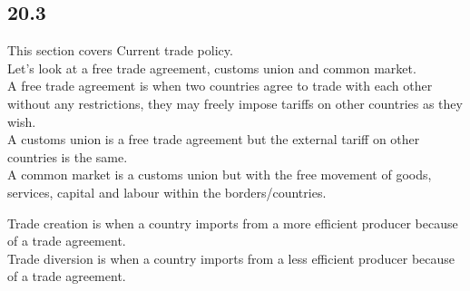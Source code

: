 \subsection*{20.3}
This section covers Current trade policy.\\
Let's look at a free trade agreement, customs union and common market.\\
A free trade agreement is when two countries agree to trade with each other without any restrictions,
they may freely impose tariffs on other countries as they wish.\\
A customs union is a free trade agreement but the external tariff on other countries is the same.\\
A common market is a customs union but with the free movement of goods, services, capital and labour within the borders/countries.
\par
Trade creation is when a country imports from a more efficient producer because of a trade agreement.\\
Trade diversion is when a country imports from a less efficient producer because of a trade agreement.